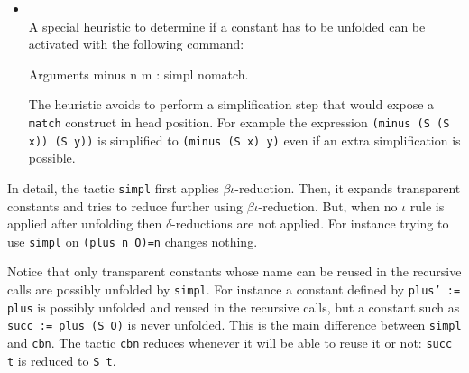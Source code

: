 \begin{itemize}
{\tt simpl}, while {\tt (minus (S x) (S y))} is reduced to {\tt (minus x y)}.
\item {}\\
A special heuristic to determine if a constant has to be unfolded can be
activated with the following command:
\begin{coq_example*}
Arguments minus n m : simpl nomatch.
\end{coq_example*}
The heuristic avoids to perform a simplification step that would
expose a {\tt match} construct in head position. For example the
expression {\tt (minus (S (S x)) (S y))} is simplified to
{\tt (minus (S x) y)} even if an extra simplification is possible.
\end{itemize}

In detail, the tactic \texttt{simpl} first applies
$\beta\iota$-reduction.  Then, it expands transparent constants and
tries to reduce further using $\beta\iota$-reduction. But, when no
$\iota$ rule is applied after unfolding then $\delta$-reductions are
not applied. For instance trying to use \texttt{simpl} on
\texttt{(plus n O)=n} changes nothing.

Notice that only transparent constants whose name can be reused in the
recursive calls are possibly unfolded by \texttt{simpl}. For instance
a constant defined by \texttt{plus' := plus} is possibly unfolded and
reused in the recursive calls, but a constant such as \texttt{succ :=
  plus (S O)} is never unfolded. This is the main difference between
\texttt{simpl} and \texttt{cbn}. The tactic \texttt{cbn} reduces
whenever it will be able to reuse it or not: \texttt{succ t} is
reduced to \texttt{S t}.

